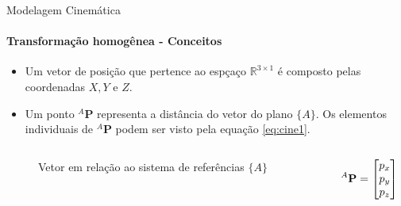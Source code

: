 \documentclass{beamer}
\begin{document}
\begin{frame}{Modelagem Cinemática}
    \framesubtitle{Transformação homogênea - Conceitos}
    \begin{itemize}
        \item Um vetor de posição que pertence ao espçaço $\mathbb{R}^{3 \times 1}$ é composto pelas coordenadas $X,Y$ e $Z$.
        \item Um ponto ${}^A\mathbf{P}$ representa a distância do vetor do plano $\{A\}$. Os elementos individuais de ${}^A\mathbf{P}$ podem ser visto pela equação \eqref{eq:cine1}.
    \end{itemize}
    \begin{columns}[c]
        \begin{column}{0.6\textwidth}
            \begin{figure}
                \centering
                \caption{Vetor em relação ao sistema de referências $\{A\}$}
                \label{fig:cine1f}
            \end{figure}
        \end{column}
        \begin{column}{0.3\textwidth}
            \begin{equation}\label{eq:cine1}
                \color{black}{{}^A\mathbf{P} = \begin{bmatrix}
                    p_x \\ p_y \\ p_z
                \end{bmatrix}}
                \color{gray}{}
            \end{equation}
        \end{column}
    \end{columns}
\end{frame}
\end{document}
